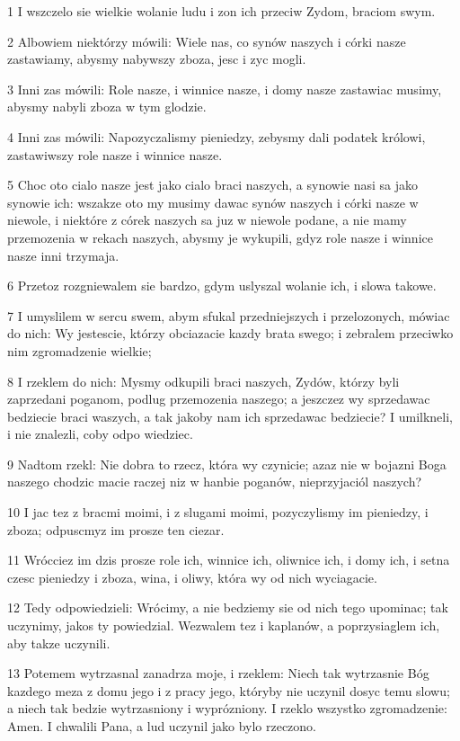 \par 1 I wszczelo sie wielkie wolanie ludu i zon ich przeciw Zydom, braciom swym.
\par 2 Albowiem niektórzy mówili: Wiele nas, co synów naszych i córki nasze zastawiamy, abysmy nabywszy zboza, jesc i zyc mogli.
\par 3 Inni zas mówili: Role nasze, i winnice nasze, i domy nasze zastawiac musimy, abysmy nabyli zboza w tym glodzie.
\par 4 Inni zas mówili: Napozyczalismy pieniedzy, zebysmy dali podatek królowi, zastawiwszy role nasze i winnice nasze.
\par 5 Choc oto cialo nasze jest jako cialo braci naszych, a synowie nasi sa jako synowie ich: wszakze oto my musimy dawac synów naszych i córki nasze w niewole, i niektóre z córek naszych sa juz w niewole podane, a nie mamy przemozenia w rekach naszych, abysmy je wykupili, gdyz role nasze i winnice nasze inni trzymaja.
\par 6 Przetoz rozgniewalem sie bardzo, gdym uslyszal wolanie ich, i slowa takowe.
\par 7 I umyslilem w sercu swem, abym sfukal przedniejszych i przelozonych, mówiac do nich: Wy jestescie, którzy obciazacie kazdy brata swego; i zebralem przeciwko nim zgromadzenie wielkie;
\par 8 I rzeklem do nich: Mysmy odkupili braci naszych, Zydów, którzy byli zaprzedani poganom, podlug przemozenia naszego; a jeszczez wy sprzedawac bedziecie braci waszych, a tak jakoby nam ich sprzedawac bedziecie? I umilkneli, i nie znalezli, coby odpo wiedziec.
\par 9 Nadtom rzekl: Nie dobra to rzecz, która wy czynicie; azaz nie w bojazni Boga naszego chodzic macie raczej niz w hanbie poganów, nieprzyjaciól naszych?
\par 10 I jac tez z bracmi moimi, i z slugami moimi, pozyczylismy im pieniedzy, i zboza; odpuscmyz im prosze ten ciezar.
\par 11 Wrócciez im dzis prosze role ich, winnice ich, oliwnice ich, i domy ich, i setna czesc pieniedzy i zboza, wina, i oliwy, która wy od nich wyciagacie.
\par 12 Tedy odpowiedzieli: Wrócimy, a nie bedziemy sie od nich tego upominac; tak uczynimy, jakos ty powiedzial. Wezwalem tez i kaplanów, a poprzysiaglem ich, aby takze uczynili.
\par 13 Potemem wytrzasnal zanadrza moje, i rzeklem: Niech tak wytrzasnie Bóg kazdego meza z domu jego i z pracy jego, któryby nie uczynil dosyc temu slowu; a niech tak bedzie wytrzasniony i wyprózniony. I rzeklo wszystko zgromadzenie: Amen. I chwalili Pana, a lud uczynil jako bylo rzeczono.

